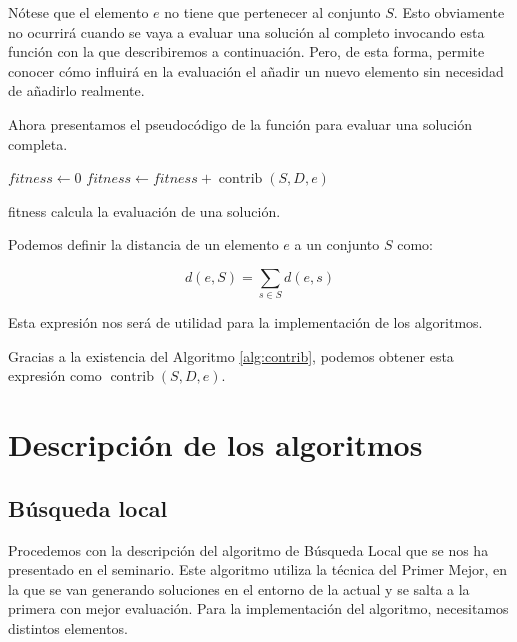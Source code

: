 \documentclass{article}
\begin{document}
Nótese que el elemento $e$ no tiene que pertenecer al conjunto $S$. Esto obviamente no ocurrirá cuando se vaya a evaluar una solución
al completo invocando esta función con la que describiremos a continuación. Pero, de esta forma, permite conocer cómo influirá en la evaluación el añadir
 un nuevo elemento sin necesidad de añadirlo realmente. 
 
 Ahora presentamos el pseudocódigo de la función para evaluar una solución completa.
 \begin{algorithm}
 	\DontPrintSemicolon %
 	$fitness \gets 0$\;
 	 {
 		$fitness \gets fitness + \operatorname{contrib}(S,D,e)$ 
 	}
 	  
 	\caption{{\sc fitness} calcula la evaluación de una solución.}
 	\label{alg:eval}
 \end{algorithm}

Podemos definir la distancia de un elemento $e$ a un conjunto $S$ como:

\begin{equation} \label{eq:distance-elem-set}
	d(e,S)=\sum_{s\in S} d(e,s)
\end{equation}

Esta expresión nos será de utilidad para la implementación de los algoritmos.

Gracias a la existencia del Algoritmo \ref{alg:contrib}, podemos obtener esta expresión como $\operatorname{contrib}(S,D,e)$.

\pagebreak

\section{Descripción de los algoritmos}

\subsection{Búsqueda local}

Procedemos con la descripción del algoritmo de Búsqueda Local que se nos ha presentado en el seminario. 
Este algoritmo utiliza la técnica del Primer Mejor, en la que se van generando soluciones en el entorno de la actual y se
salta a la primera con mejor evaluación. Para la implementación del algoritmo, necesitamos distintos elementos.
\end{document}
